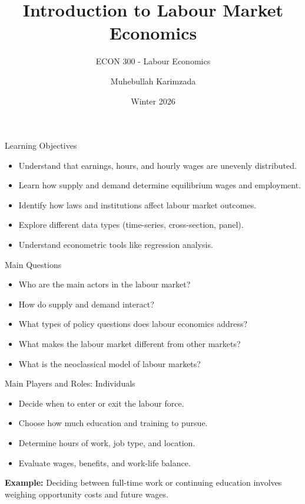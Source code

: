 \documentclass[aspectratio=169]{beamer}
\title{\textbf{Introduction to Labour Market Economics \vspace{.5cm}\\  }}
\subtitle{ {\large ECON 300 - Labour Economics}}
\author{Muhebullah Karimzada}
\date{Winter 2026}
\begin{document}
\begin{frame}[plain]
  \titlepage
\end{frame}

\begin{frame}{Learning Objectives}
\begin{itemize}
  \item Understand that earnings, hours, and hourly wages are unevenly distributed.
  \item Learn how supply and demand determine equilibrium wages and employment.
  \item Identify how laws and institutions affect labour market outcomes.
  \item Explore different data types (time-series, cross-section, panel).
  \item Understand econometric tools like regression analysis.
\end{itemize}
\end{frame}

\begin{frame}{Main Questions}
\begin{itemize}
  \item Who are the main actors in the labour market?
  \item How do supply and demand interact?
  \item What types of policy questions does labour economics address?
  \item What makes the labour market different from other markets?
  \item What is the neoclassical model of labour markets?
\end{itemize}
\end{frame}

\begin{frame}{Main Players and Roles: Individuals}
\begin{itemize}
  \item Decide when to enter or exit the labour force.
  \item Choose how much education and training to pursue.
  \item Determine hours of work, job type, and location.
  \item Evaluate wages, benefits, and work-life balance.
\end{itemize}
\textbf{Example:} Deciding between full-time work or continuing education involves weighing opportunity costs and future wages.
\end{frame}
\end{document}
